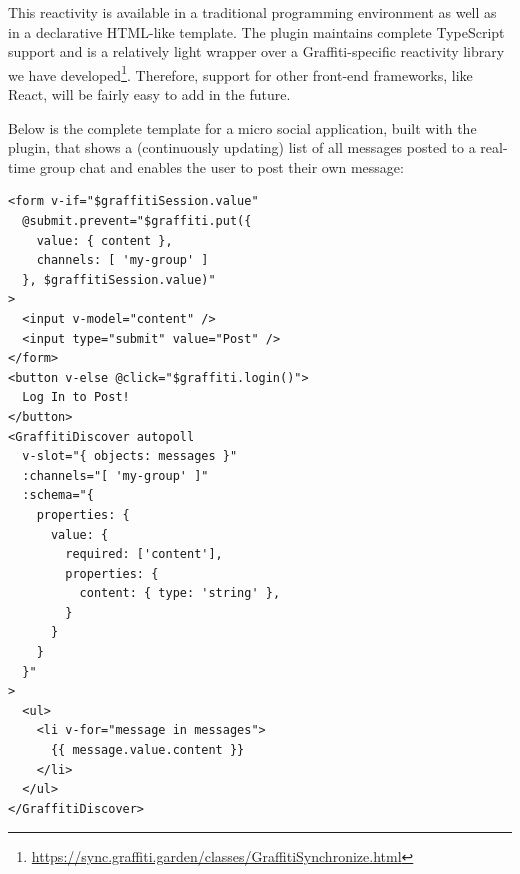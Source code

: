 


This reactivity is available in a traditional programming
environment as well as in a declarative HTML-like template.
The plugin maintains complete TypeScript support and
is a relatively light wrapper over a Graffiti-specific reactivity library we have developed\footnote{
   \url{https://sync.graffiti.garden/classes/GraffitiSynchronize.html}
}.
Therefore, support for other front-end frameworks, like React, will be
fairly easy to add in the future.

Below is the complete template for a micro social application,
built with the plugin, that shows a (continuously updating) list of all messages posted to a real-time group chat and enables the user to post their own message:
\begin{verbatim}
<form v-if="$graffitiSession.value"
  @submit.prevent="$graffiti.put({
    value: { content },
    channels: [ 'my-group' ]
  }, $graffitiSession.value)"
>
  <input v-model="content" />
  <input type="submit" value="Post" />
</form>
<button v-else @click="$graffiti.login()">
  Log In to Post!
</button>
<GraffitiDiscover autopoll
  v-slot="{ objects: messages }"
  :channels="[ 'my-group' ]"
  :schema="{
    properties: {
      value: {
        required: ['content'],
        properties: {
          content: { type: 'string' },
        }
      }
    }
  }"
>
  <ul>
    <li v-for="message in messages">
      {{ message.value.content }}
    </li>
  </ul>
</GraffitiDiscover>
\end{verbatim}

